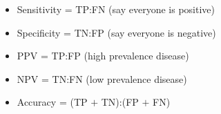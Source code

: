 \documentclass[10pt]{beamer}
\begin{document}
\begin{frame}
	\begin{itemize}
		\item Sensitivity = TP:FN (say everyone is positive)
		\item Specificity = TN:FP (say everyone is negative)
		\item PPV = TP:FP (high prevalence disease)
		\item NPV = TN:FN (low prevalence disease)
		\item Accuracy = (TP $+$ TN):(FP $+$ FN)
	\end{itemize}

\end{frame}


\end{document}
